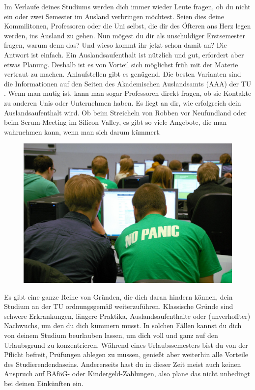 Im Verlaufe deines Studiums werden dich immer wieder Leute fragen, ob du nicht ein oder zwei Semester im Ausland verbringen möchtest. 
Seien dies deine Kommilitonen, Professoren oder die Uni selbst, die dir des Öfteren ans Herz legen werden, ins Ausland zu gehen. 
Nun mögest du dir als unschuldiger Erstsemester fragen, warum denn das? 
Und wieso kommt ihr jetzt schon damit an? 
Die Antwort ist einfach. 
Ein Auslandsaufenthalt ist nützlich und gut, erfordert aber etwas Planung. 
Deshalb ist es von Vorteil sich möglichst früh mit der Materie vertraut zu machen. 
Anlaufstellen gibt es genügend. 
Die besten Varianten sind die Informationen auf den Seiten des Akademischen Auslandsamts (AAA) der TU . 
Wenn man mutig ist, kann man sogar Professoren direkt fragen, ob sie Kontakte zu anderen Unis oder Unternehmen haben. 
Es liegt an dir, wie erfolgreich dein Auslandsaufenthalt wird. 
Ob beim Streicheln von Robben vor Neufundland oder beim Scrum-Meeting im Silicon Valley, es gibt so viele Angebote, die man wahrnehmen kann, wenn man sich darum kümmert.

\begin{figure}[b!]
	\centering
	\includegraphics[width=0.9\linewidth]{img/ese2014/einschreibung.jpg}
\end{figure}%

Es gibt eine ganze Reihe von Gründen, die dich daran hindern können, dein Studium an der TU ordnungsgemäß weiterzuführen.
Klassische Gründe sind schwere Erkrankungen, längere Praktika, Auslandsaufenthalte oder (unverhoffter) Nachwuchs, um den du dich kümmern musst.
In solchen Fällen kannst du dich von deinem Studium beurlauben lassen, um dich voll und ganz auf den Urlaubsgrund zu konzentrieren.
Während eines Urlaubssemesters bist du von der Pflicht befreit, Prüfungen ablegen zu müssen, genießt aber weiterhin alle Vorteile des Studierendendaseins.
Andererseits hast du in dieser Zeit meist auch keinen Anspruch auf BAföG- oder Kindergeld-Zahlungen, also plane das nicht unbedingt bei deinen Einkünften ein.

